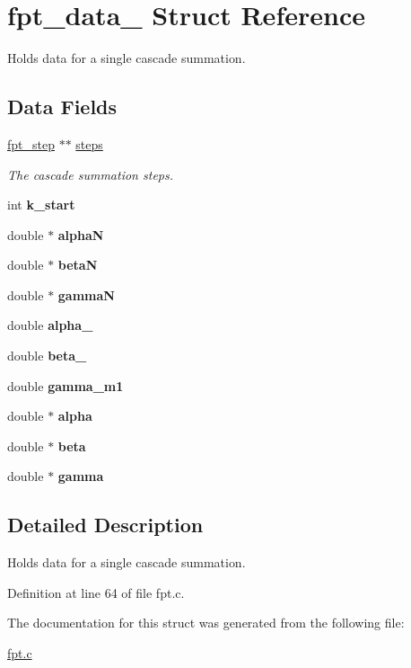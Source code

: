\hypertarget{structfpt__data__}{
\section{fpt\_\-data\_\- Struct Reference}
\label{structfpt__data__}
}
Holds data for a single cascade summation.  


\subsection*{Data Fields}
\begin{CompactItemize}
\item 
\hypertarget{structfpt__data___o0}{
\hyperlink{structfpt__step__}{fpt\_\-step} $\ast$$\ast$ \hyperlink{structfpt__data___o0}{steps}}
\label{structfpt__data___o0}

\begin{CompactList}\small\item\em The cascade summation steps. \item\end{CompactList}\item 
\hypertarget{structfpt__data___o1}{
int {\bf k\_\-start}}
\label{structfpt__data___o1}

\item 
\hypertarget{structfpt__data___o2}{
double $\ast$ {\bf alpha\-N}}
\label{structfpt__data___o2}

\item 
\hypertarget{structfpt__data___o3}{
double $\ast$ {\bf beta\-N}}
\label{structfpt__data___o3}

\item 
\hypertarget{structfpt__data___o4}{
double $\ast$ {\bf gamma\-N}}
\label{structfpt__data___o4}

\item 
\hypertarget{structfpt__data___o5}{
double {\bf alpha\_}}
\label{structfpt__data___o5}

\item 
\hypertarget{structfpt__data___o6}{
double {\bf beta\_}}
\label{structfpt__data___o6}

\item 
\hypertarget{structfpt__data___o7}{
double {\bf gamma\_\-m1}}
\label{structfpt__data___o7}

\item 
\hypertarget{structfpt__data___o8}{
double $\ast$ {\bf alpha}}
\label{structfpt__data___o8}

\item 
\hypertarget{structfpt__data___o9}{
double $\ast$ {\bf beta}}
\label{structfpt__data___o9}

\item 
\hypertarget{structfpt__data___o10}{
double $\ast$ {\bf gamma}}
\label{structfpt__data___o10}

\end{CompactItemize}


\subsection{Detailed Description}
Holds data for a single cascade summation. 



Definition at line 64 of file fpt.c.

The documentation for this struct was generated from the following file:\begin{CompactItemize}
\item 
\hyperlink{fpt_8c}{fpt.c}\end{CompactItemize}

